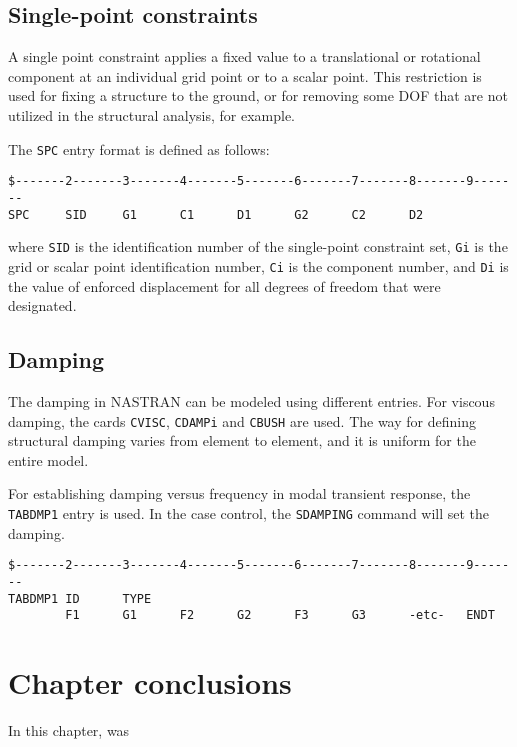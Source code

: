 \subsection{Single-point constraints}

A single point constraint applies a fixed value to a translational or rotational component at an individual grid point or to a scalar point. This restriction is used for fixing a structure to the ground, or for removing some DOF that are not utilized in the structural analysis, for example.

The \texttt{SPC} entry format is defined as follows:

\begin{lstlisting}
$-------2-------3-------4-------5-------6-------7-------8-------9-------
SPC     SID     G1      C1      D1      G2      C2      D2
\end{lstlisting}

where \texttt{SID} is the identification number of the single-point constraint set, \texttt{Gi} is the grid or scalar point identification number, \texttt{Ci} is the component number, and \texttt{Di} is the value of enforced displacement for all degrees of freedom that were designated.

\subsection{Damping}

The damping in NASTRAN can be modeled using different entries. For viscous damping, the cards \texttt{CVISC}, \texttt{CDAMPi} and \texttt{CBUSH} are used. The way for defining structural damping varies from element to element, and it is uniform for the entire model.

For establishing damping versus frequency in modal transient response, the \texttt{TABDMP1} entry is used. In the case control, the \texttt{SDAMPING} command will set the damping.

\begin{lstlisting}
$-------2-------3-------4-------5-------6-------7-------8-------9-------
TABDMP1 ID      TYPE
        F1      G1      F2      G2      F3      G3      -etc-   ENDT
\end{lstlisting}

\section{Chapter conclusions}

In this chapter, was 